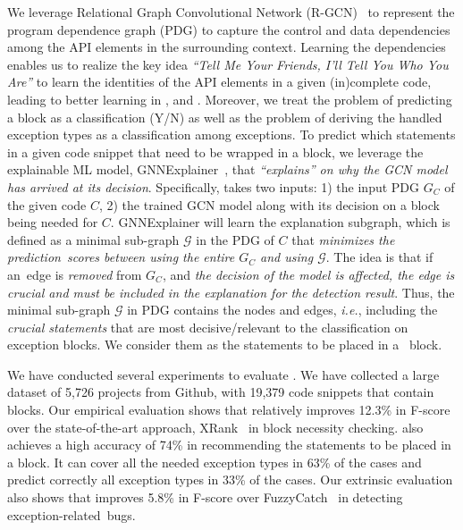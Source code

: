 We leverage Relational Graph Convolutional Network (R-GCN)~\cite{rgcn}
to represent the program dependence graph (PDG) to capture the control
and data dependencies among the API elements in the surrounding
context. Learning the dependencies enables us to realize the
key idea {\em ``Tell Me Your Friends, I'll Tell You Who You Are''} to
learn the identities of the API elements in a given (in)complete code,
leading to better learning in {\xblock}, {\xstate} and
{\xtype}. Moreover, we treat the problem of predicting a
 block as a classification (Y/N) as well as the
problem of deriving the handled exception types as a classification
among exceptions.
%
To predict which statements in a given code snippet that need to be
wrapped in a  block, we leverage the explainable ML
model, GNNExplainer~\cite{GNNExplainer}, that {\em ``explains'' on why
  the GCN model has arrived at its decision}. Specifically, {\tool}
takes two inputs: 1) the input PDG $G_C$ of the given code $C$,
2) the trained GCN model along with its decision on a
 block being needed for $C$.
%
GNNExplainer will learn the explanation subgraph, which is
defined as a minimal sub-graph $\mathcal{G}$ in the PDG of $C$ that
{\em minimizes the prediction~scores between using the entire $G_C$
  and using $\mathcal{G}$}. The idea is that if an~edge is {\em
  removed} from $G_C$, and {\em the decision of the model is affected,
  the edge is crucial and must be included in the explanation for
  the detection result}. Thus, the minimal sub-graph $\mathcal{G}$ in
PDG contains the nodes and edges, {\em i.e.},  including the {\em
  crucial statements} that are most decisive/relevant to the
classification on exception blocks. We consider them as the statements
to be placed in a ~block.

We have conducted several experiments to evaluate {\tool}. We have
collected a large dataset of 5,726 projects from Github, with 19,379
code snippets that contain  blocks.
%
Our empirical evaluation shows that {\tool} relatively
improves 12.3\% in F-score over the state-of-the-art approach,
XRank~\cite{xrank-fse20} in  block necessity checking.
{\tool} also achieves a high accuracy of 74\% in recommending the
statements to be placed in a  block. It can cover all
the needed exception types in 63\% of the cases and predict correctly
all exception types in 33\% of the cases. Our extrinsic evaluation
also shows that {\tool} improves 5.8\% in F-score over
FuzzyCatch~\cite{xrank-fse20} in detecting exception-related~bugs.

